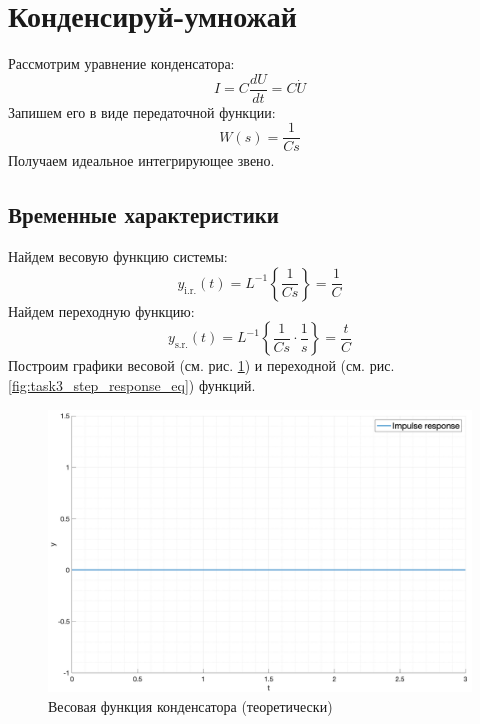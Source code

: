 \section{Конденсируй-умножай}
Рассмотрим уравнение конденсатора:
\begin{equation}
    I = C\frac{dU}{dt} = C\dot{U}
\end{equation}
Запишем его в виде передаточной функции:
\begin{equation}
    W(s) = \frac{1}{Cs}
\end{equation}
Получаем идеальное интегрирующее звено.
\subsection{Временные характеристики}
\noindent Найдем весовую функцию системы:
\begin{equation}
    y_{\text{i.r.}}(t) = L^{-1}\left\{\frac{1}{Cs}\right\} = \frac{1}{C} 
\end{equation}
Найдем переходную функцию:
\begin{equation}
    y_{\text{s.r.}}(t) = L^{-1}\left\{\frac{1}{Cs}\cdot\frac{1}{s}\right\} = \frac{t}{C} 
\end{equation}
Построим графики весовой (см. рис. \ref{fig:task3_impulse_response_eq}) и переходной (см. рис. \ref{fig:task3_step_response_eq}) функций.
\begin{figure}[ht!]
    \centering
    \includegraphics[width=\textwidth]{media/plots/task3_impulse_response_eq.png}
    \caption{Весовая функция конденсатора (теоретически)}
    \label{fig:task3_impulse_response_eq}
\end{figure}
